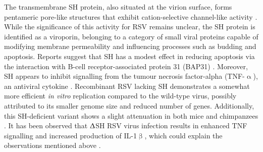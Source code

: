The transmembrane SH protein, also situated at the virion surface, forms pentameric pore-like structures that exhibit cation-selective channel-like activity \cite{Carter2010DirectPermeability, Gan2012TheChannels}. While the significance of this activity for RSV remains unclear, the SH protein is identified as a viroporin, belonging to a category of small viral proteins capable of modifying membrane permeability and influencing processes such as budding and apoptosis. Reports suggest that SH has a modest effect in reducing apoptosis via the interaction with B-cell receptor-associated protein 31 (BAP31) \cite{Fuentes2007FunctionProtein}. Moreover, SH appears to inhibit signalling from the tumour necrosis factor-alpha (TNF-$\upalpha$), an antiviral cytokine \cite{Fuentes2007FunctionProtein}. Recombinant RSV lacking SH demonstrates a somewhat more efficient \textit{in vitro} replication compared to the wild-type virus, possibly attributed to its smaller genome size and reduced number of genes. Additionally, this SH-deficient variant shows a slight attenuation in both mice and chimpanzees \cite{Whitehead1999RecombinantChimpanzees}. It has been observed that $\Updelta$SH RSV virus infection results in enhanced TNF signalling and increased production of IL-1$\upbeta$, which could explain the observations mentioned above \cite{Pollock2017ModulationProtein}. 

